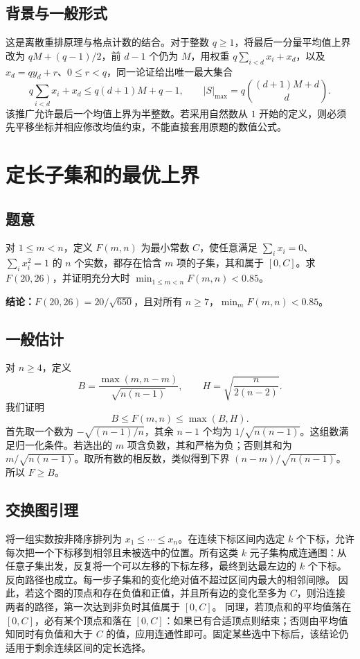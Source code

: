 \documentclass[UTF8,11pt,a4paper,fontset=fandol]{ctexart}
\newcommand{\ans}[1]{\par\noindent\textcolor{accent}{\textbf{结论：}}#1\par}
\begin{document}
\subsection*{背景与一般形式}
这是离散重排原理与格点计数的结合。对于整数 $q\ge1$，将最后一分量平均值上界改为 $qM+(q-1)/2$，前 $d-1$ 个仍为 $M$，用权重 $q\sum_{i<d}x_i+x_d$，以及 $x_d=qy_d+r$、$0\le r<q$，同一论证给出唯一最大集合
\[
q\sum_{i<d}x_i+x_d\le q(d+1)M+q-1,
\qquad
|S|_{\max}=q\binom{(d+1)M+d}{d}.
\]
该推广允许最后一个均值上界为半整数。若采用自然数从 $1$ 开始的定义，则必须先平移坐标并相应修改均值约束，不能直接套用原题的数值公式。

\section{定长子集和的最优上界}
\subsection*{题意}
对 $1\le m<n$，定义 $F(m,n)$ 为最小常数 $C$，使任意满足 $\sum_i x_i=0$、$\sum_i x_i^2=1$ 的 $n$ 个实数，都存在恰含 $m$ 项的子集，其和属于 $[0,C]$。求 $F(20,26)$，并证明充分大时 $\min_{1\le m<n}F(m,n)<0.85$。
\ans{$\displaystyle F(20,26)=20/\sqrt{650}$，且对所有 $n\ge7$，$\min_m F(m,n)<0.85$。}
\subsection*{一般估计}
对 $n\ge4$，定义
\[
B=\frac{\max(m,n-m)}{\sqrt{n(n-1)}},
\qquad H=\sqrt{\frac{n}{2(n-2)}}.
\]
我们证明
\[
B\le F(m,n)\le\max(B,H). \tag{4}
\]
首先取一个数为 $-\sqrt{(n-1)/n}$，其余 $n-1$ 个均为 $1/\sqrt{n(n-1)}$。这组数满足归一化条件。若选出的 $m$ 项含负数，其和严格为负；否则其和为 $m/\sqrt{n(n-1)}$。取所有数的相反数，类似得到下界 $(n-m)/\sqrt{n(n-1)}$。所以 $F\ge B$。
\subsection*{交换图引理}
将一组实数按非降序排列为 $x_1\le\cdots\le x_n$。在连续下标区间内选定 $k$ 个下标，允许每次把一个下标移到相邻且未被选中的位置。所有这类 $k$ 元子集构成连通图：从任意子集出发，反复将一个可以左移的下标左移，最终到达最左边的 $k$ 个下标。反向路径也成立。每一步子集和的变化绝对值不超过区间内最大的相邻间隙。
因此，若这个图的顶点和存在负值和正值，并且所有边的变化至多为 $C$，则沿连接两者的路径，第一次达到非负时其值属于 $[0,C]$。
同理，若顶点和的平均值落在 $[0,C]$，必有某个顶点和落在 $[0,C]$：如果已有合适顶点则结束；否则由平均值知同时有负值和大于 $C$ 的值，应用连通性即可。固定某些选中下标后，该结论仍适用于剩余连续区间的定长选择。
\end{document}
